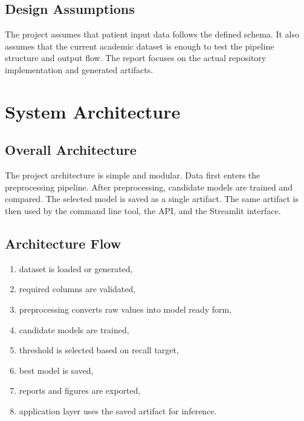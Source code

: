 \documentclass[12pt,a4paper,openany]{report}
\begin{document}
    \section{Design Assumptions}
    The project assumes that patient input data follows the defined schema. It also assumes that the current academic dataset is enough to test the pipeline structure and output flow. The report focuses on the actual repository implementation and generated artifacts.

    \chapter{System Architecture}
    \section{Overall Architecture}
    The project architecture is simple and modular. Data first enters the preprocessing pipeline. After preprocessing, candidate models are trained and compared. The selected model is saved as a single artifact. The same artifact is then used by the command line tool, the API, and the Streamlit interface.

    \section{Architecture Flow}
    \begin{enumerate}[leftmargin=1.4cm]
    \item dataset is loaded or generated,
    \item required columns are validated,
    \item preprocessing converts raw values into model ready form,
    \item candidate models are trained,
    \item threshold is selected based on recall target,
    \item best model is saved,
    \item reports and figures are exported,
    \item application layer uses the saved artifact for inference.
    \end{enumerate}
\end{document}
